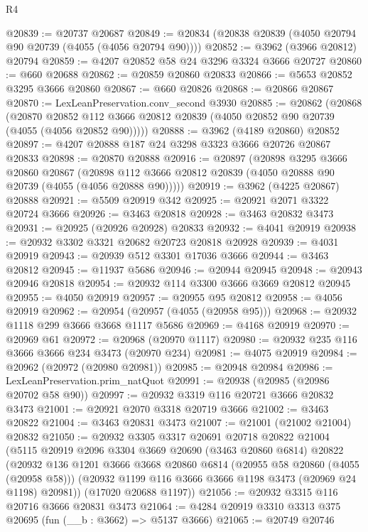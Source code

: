 \begin{lexlean}{R4}
\begin{coremodule}
@20839 := @20737 @20687
@20849 := @20834 (@20838 @20839 (@4050 @20794 @90 @20739 (@4055 (@4056 @20794 @90))))
@20852 := @3962 (@3966 @20812) @20794
@20859 := @4207 @20852 @58 @24 @3296 @3324 @3666 @20727
@20860 := @660 @20688
@20862 := @20859 @20860 @20833
@20866 := @5653 @20852 @3295 @3666 @20860
@20867 := @660 @20826
@20868 := @20866 @20867
@20870 := LexLeanPreservation.conv_second @3930
@20885 := @20862
    (@20868
      (@20870 @20852 @112 @3666 @20812 @20839 (@4050 @20852 @90 @20739 (@4055 (@4056 @20852 @90)))))
@20888 := @3962 (@4189 @20860) @20852
@20897 := @4207 @20888 @187 @24 @3298 @3323 @3666 @20726 @20867 @20833
@20898 := @20870 @20888
@20916 := @20897
    (@20898
      @3295
      @3666
      @20860
      @20867
      (@20898 @112 @3666 @20812 @20839 (@4050 @20888 @90 @20739 (@4055 (@4056 @20888 @90)))))
@20919 := @3962 (@4225 @20867) @20888
@20921 := @5509 @20919 @342
@20925 := @20921 @2071 @3322 @20724 @3666
@20926 := @3463 @20818
@20928 := @3463 @20832 @3473
@20931 := @20925 (@20926 @20928) @20833
@20932 := @4041 @20919
@20938 := @20932 @3302 @3321 @20682 @20723 @20818 @20928
@20939 := @4031 @20919
@20943 := @20939 @512 @3301 @17036 @3666
@20944 := @3463 @20812
@20945 := @11937 @5686
@20946 := @20944 @20945
@20948 := @20943 @20946 @20818
@20954 := @20932 @114 @3300 @3666 @3669 @20812 @20945
@20955 := @4050 @20919
@20957 := @20955 @95 @20812
@20958 := @4056 @20919
@20962 := @20954 (@20957 (@4055 (@20958 @95)))
@20968 := @20932 @1118 @299 @3666 @3668 @1117 @5686
@20969 := @4168 @20919
@20970 := @20969 @61
@20972 := @20968 (@20970 @1117)
@20980 := @20932 @235 @116 @3666 @3666 @234 @3473 (@20970 @234)
@20981 := @4075 @20919
@20984 := @20962 (@20972 (@20980 @20981))
@20985 := @20948 @20984
@20986 := LexLeanPreservation.prim_natQuot
@20991 := @20938 (@20985 (@20986 @20702 @58 @90))
@20997 := @20932 @3319 @116 @20721 @3666 @20832 @3473
@21001 := @20921 @2070 @3318 @20719 @3666
@21002 := @3463 @20822
@21004 := @3463 @20831 @3473
@21007 := @21001 (@21002 @21004) @20832
@21050 := @20932
    @3305
    @3317
    @20691
    @20718
    @20822
    @21004
    (@5115
      @20919
      @2096
      @3304
      @3669
      @20690
      (@3463 @20860 @6814)
      @20822
      (@20932
        @136
        @1201
        @3666
        @3668
        @20860
        @6814
        (@20955 @58 @20860 (@4055 (@20958 @58)))
        (@20932 @1199 @116 @3666 @3666 @1198 @3473 (@20969 @24 @1198) @20981))
      (@17020 @20688 @1197))
@21056 := @20932 @3315 @116 @20716 @3666 @20831 @3473
@21064 := @4284 @20919 @3310 @3313 @375 @20695 (fun (__b : @3662) => @5137 @3666)
@21065 := @20749 @20746

\end{coremodule}
\end{lexlean}
